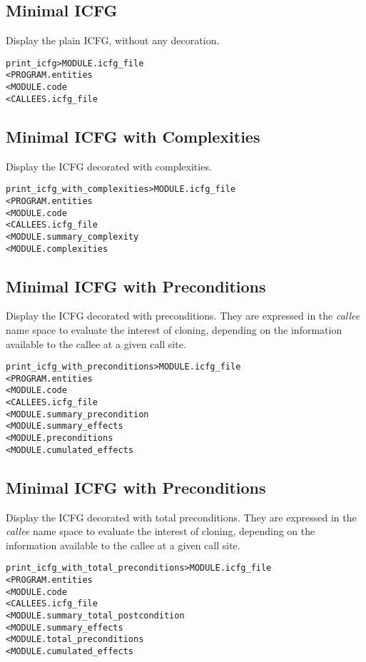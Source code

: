\documentclass[a4paper]{report}
\newenvironment{PipsMake}{\begin{alltt}}{\end{alltt}}
\begin{document}
\subsection{Minimal ICFG}

Display the plain ICFG, without any decoration.
\begin{PipsMake}
print_icfg                      > MODULE.icfg_file
        < PROGRAM.entities
        < MODULE.code
        < CALLEES.icfg_file
\end{PipsMake}

\subsection{Minimal ICFG with Complexities}

Display the ICFG decorated with complexities.
\begin{PipsMake}
print_icfg_with_complexities            > MODULE.icfg_file
        < PROGRAM.entities
        < MODULE.code
        < CALLEES.icfg_file
        < MODULE.summary_complexity
        < MODULE.complexities
\end{PipsMake}

\subsection{Minimal ICFG with Preconditions}

Display the ICFG decorated with preconditions. They are expressed in the
\emph{callee} name space to evaluate the interest of cloning, depending on
the information available to the callee at a given call site.
\begin{PipsMake}
print_icfg_with_preconditions            > MODULE.icfg_file
        < PROGRAM.entities
        < MODULE.code
        < CALLEES.icfg_file
        < MODULE.summary_precondition
        < MODULE.summary_effects
        < MODULE.preconditions
        < MODULE.cumulated_effects
\end{PipsMake}

\subsection{Minimal ICFG with Preconditions}

Display the ICFG decorated with total preconditions. They are expressed in the
\emph{callee} name space to evaluate the interest of cloning, depending on
the information available to the callee at a given call site.
\begin{PipsMake}
print_icfg_with_total_preconditions            > MODULE.icfg_file
        < PROGRAM.entities
        < MODULE.code
        < CALLEES.icfg_file
        < MODULE.summary_total_postcondition
        < MODULE.summary_effects
        < MODULE.total_preconditions
        < MODULE.cumulated_effects
\end{PipsMake}
\end{document}
